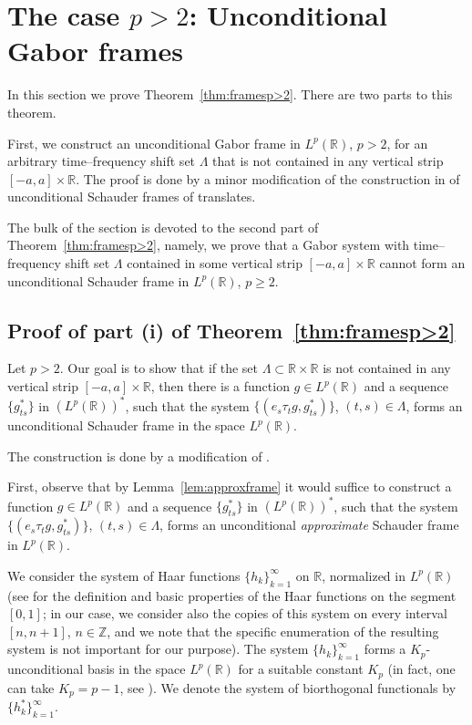 \documentclass[reqno,a4paper,12pt]{amsart}
\numberwithin{equation}{section}
\numberwithin{figure}{section}
\newcommand\R{\mathbb{R}}
\newcommand\Z{\mathbb{Z}}
\newcommand\Lam{\Lambda}
\newcommand\1{\mathds{1}}
\renewcommand\ge{\geqslant}
\newcommand\sbt{\subset}
\theoremstyle{plain}
\newcommand{\thmref}[1]{Theorem~\ref{#1}}
\newcommand{\lemref}[1]{Lemma~\ref{#1}}
\theoremstyle{definition}
\begin{document}
\section{The case $p > 2$: Unconditional Gabor frames}
\label{sec:framesp>2}

In this section we prove \thmref{thm:framesp>2}. There are two parts to this theorem. 

First, we construct an unconditional Gabor frame in  $L^p(\R)$, $p>2$,
for an arbitrary time--frequency shift set $\Lambda$ that is
not contained in any vertical strip $[-a, a]\times\R$.  The proof is 
done by a minor modification of the construction 
in \cite{FOSZ14} of unconditional Schauder frames of translates.


The bulk of the section is devoted to the second part of 
\thmref{thm:framesp>2}, namely, we prove that 
a Gabor system with time--frequency shift set $\Lambda$ 
contained in some vertical strip $[-a, a]\times\R$
cannot form an unconditional Schauder frame in $L^p(\R)$, $p \ge 2$.



\subsection{Proof of part (i) of \thmref{thm:framesp>2}}
Let $p>2$. Our goal is to show that if the set $\Lam \sbt \R \times \R$ is not
 contained in any vertical strip $[-a, a]\times\R$,
 then there is a function $g\in L^p(\R)$ and a 
sequence $\{ g^*_{ts} \}$ in $(L^p(\R))^*$,
such that the system $\{(e_s \tau_t g, g^*_{ts})\}$, $(t,s) \in \Lam$, 
forms an unconditional Schauder frame in the space $L^p(\R)$.

The construction is done by a modification of \cite[Theorem 3.2]{FOSZ14}.

First, observe that  by \lemref{lem:approxframe}
it would suffice to construct a function $g\in L^p(\R)$ and a 
sequence $\{ g^*_{ts} \}$ in $(L^p(\R))^*$,
such that the system $\{(e_s \tau_t g, g^*_{ts})\}$, $(t,s) \in \Lam$, 
forms an unconditional \emph{approximate} Schauder frame in $L^p(\R)$.



We consider the system of Haar functions $\{h_k\}_{k=1}^\infty$ 
on $\R$, normalized in $L^p(\R)$ (see \cite[Section 6.1]{AK16} 
for the definition and basic properties of the Haar functions on the 
segment $[0,1]$; in our case, we consider also the copies of this 
system on every interval $[n, n+1]$, $n\in\Z$, and we note that
the specific enumeration of the resulting system is not important
for our purpose). The system 
$\{h_k\}_{k=1}^\infty$ forms a $K_p$-unconditional basis in the 
space $L^p(\R)$ for a suitable constant $K_p$ 
(in fact, one can take $K_p = p-1$,
see \cite[Theorem 6.1.7]{AK16}). We denote the system of
biorthogonal functionals by $\{h_k^*\}_{k=1}^{\infty}$. 
\end{document}
